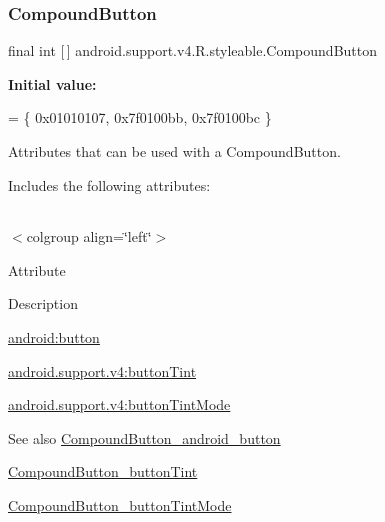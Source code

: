 \subsubsection{\texorpdfstring{Compound\+Button}{CompoundButton}}
{\footnotesize\ttfamily final int \mbox{[}$\,$\mbox{]} android.\+support.\+v4.\+R.\+styleable.\+Compound\+Button\hspace{0.3cm}{\ttfamily [static]}}

{\bfseries Initial value\+:}
\begin{DoxyCode}
= \{
            0x01010107, 0x7f0100bb, 0x7f0100bc
        \}
\end{DoxyCode}
Attributes that can be used with a Compound\+Button. 

Includes the following attributes\+:

\tabulinesep=1mm
\begin{longtabu} spread 0pt [c]{*{0}{|X[-1]}|}
\hline
\end{longtabu}
$<$colgroup align=\char`\"{}left\char`\"{}$>$ 

Attribute

Description 

{\ttfamily \hyperlink{classandroid_1_1support_1_1v4_1_1R_1_1styleable_ae8a9c7000d158886777cc07f4f6e7958}{android\+:button}}

{\ttfamily \hyperlink{classandroid_1_1support_1_1v4_1_1R_1_1styleable_aa3973f711ba64818b88ee75a71f6c911}{android.\+support.\+v4\+:button\+Tint}}

{\ttfamily \hyperlink{classandroid_1_1support_1_1v4_1_1R_1_1styleable_a93b165b3f35bb81a7874aa1c16cdd3c9}{android.\+support.\+v4\+:button\+Tint\+Mode}}

\begin{DoxySeeAlso}{See also}
\hyperlink{classandroid_1_1support_1_1v4_1_1R_1_1styleable_ae8a9c7000d158886777cc07f4f6e7958}{Compound\+Button\+\_\+android\+\_\+button} 

\hyperlink{classandroid_1_1support_1_1v4_1_1R_1_1styleable_aa3973f711ba64818b88ee75a71f6c911}{Compound\+Button\+\_\+button\+Tint} 

\hyperlink{classandroid_1_1support_1_1v4_1_1R_1_1styleable_a93b165b3f35bb81a7874aa1c16cdd3c9}{Compound\+Button\+\_\+button\+Tint\+Mode} 
\end{DoxySeeAlso}
\mbox{\label{classandroid_1_1support_1_1v4_1_1R_1_1styleable_ae8a9c7000d158886777cc07f4f6e7958}} 
